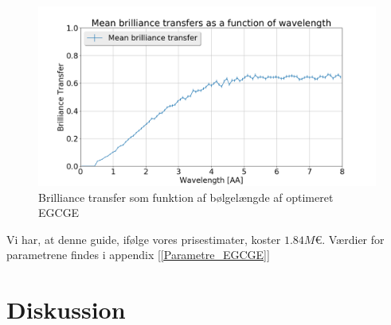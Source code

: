 \documentclass[12pt,oneside,a4paper]{article}
\begin{document}
{{{{{\begin{figure}[H]
\centering
\includegraphics[width=1\textwidth]{brill_optimized_mean_148957776280566.png}
\caption{Brilliance transfer som funktion af bølgelængde af optimeret EGCGE} \label{EGCGE_brill}
\end{figure}
Vi har, at denne guide, ifølge vores prisestimater, koster $1.84M\text{€}$. Værdier for parametrene findes i appendix [\ref{Parametre_EGCGE}]

\section{Diskussion}

}}}}}
\end{document}
